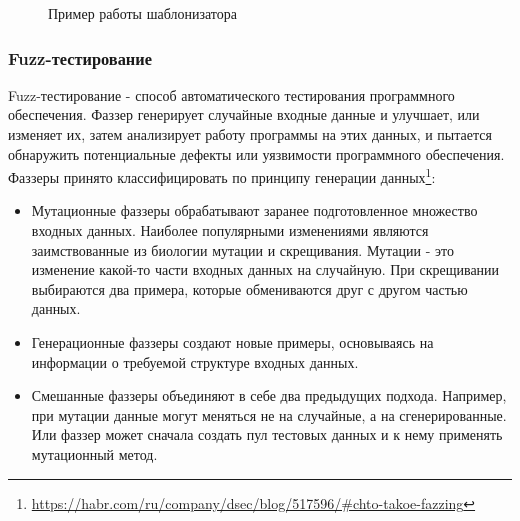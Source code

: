 \documentclass[a4paper]{article}
\begin{document}
\begin{figure}[!tbp]
\centering
{}
\hfill
{}
\caption{Пример работы шаблонизатора}
\label{PugExample}
\end{figure}


\subsubsection{Fuzz-тестирование}
\indent

Fuzz-тестирование - способ автоматического тестирования программного обеспечения. Фаззер генерирует случайные входные данные и улучшает, или изменяет их, затем анализирует работу программы на этих данных, и пытается обнаружить потенциальные дефекты или уязвимости программного обеспечения. Фаззеры принято классифицировать по принципу генерации данных\footnote{\href{https://habr.com/ru/company/dsec/blog/517596/\#chto-takoe-fazzing}{https://habr.com/ru/company/dsec/blog/517596/\#chto-takoe-fazzing}}:

\begin{itemize}
\item Мутационные фаззеры обрабатывают заранее подготовленное множество входных данных. Наиболее популярными изменениями являются заимствованные из биологии мутации и скрещивания. Мутации - это изменение какой-то части входных данных на случайную. При скрещивании выбираются два примера, которые обмениваются друг с другом частью данных.
\item Генерационные фаззеры создают новые примеры, основываясь на информации о требуемой структуре входных данных. 
\item Смешанные фаззеры объединяют в себе два предыдущих подхода. Например, при мутации данные могут меняться не на случайные, а на сгенерированные. Или фаззер может сначала создать пул тестовых данных и к нему применять мутационный метод. 
\end{itemize}
\end{document}
